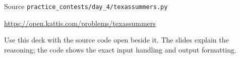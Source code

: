\documentclass[aspectratio=169,11pt]{beamer}
\begin{document}
\begin{frame}{Source}
\small
{} \texttt{practice\_contests/day\_4/texassummers.py}

\vspace{0.3cm}
 \url{https://open.kattis.com/problems/texassummers}

\vspace{0.45cm}
Use this deck with the source code open beside it. The slides explain the reasoning; the code shows the exact input handling and output formatting.
\end{frame}
\end{document}
